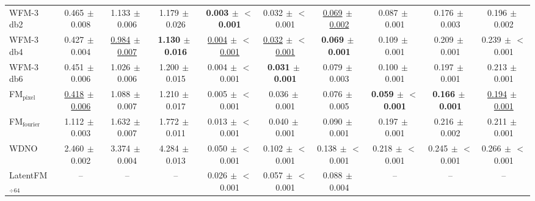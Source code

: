 \begin{table}[ht]
{\begin{tabular}{l ccc ccc ccc}
WFM-3 db2 & 0.465{\scriptsize$\,\pm\,$0.008} & 1.133{\scriptsize$\,\pm\,$0.006} & 1.179{\scriptsize$\,\pm\,$0.026} & \textbf{0.003{\scriptsize$\,\pm\,$$<$0.001}} & 0.032{\scriptsize$\,\pm\,$$<$0.001} & \underline{0.069{\scriptsize$\,\pm\,$0.002}} & 0.087{\scriptsize$\,\pm\,$0.001} & 0.176{\scriptsize$\,\pm\,$0.003} & 0.196{\scriptsize$\,\pm\,$0.002} \\
WFM-3 db4 & 0.427{\scriptsize$\,\pm\,$0.004} & \underline{0.984{\scriptsize$\,\pm\,$0.007}} & \textbf{1.130{\scriptsize$\,\pm\,$0.016}} & \underline{0.004{\scriptsize$\,\pm\,$$<$0.001}} & \underline{0.032{\scriptsize$\,\pm\,$$<$0.001}} & \textbf{0.069{\scriptsize$\,\pm\,$0.001}} & 0.109{\scriptsize$\,\pm\,$0.001} & 0.209{\scriptsize$\,\pm\,$0.001} & 0.239{\scriptsize$\,\pm\,$$<$0.001} \\
WFM-3 db6 & 0.451{\scriptsize$\,\pm\,$0.006} & 1.026{\scriptsize$\,\pm\,$0.006} & 1.200{\scriptsize$\,\pm\,$0.015} & 0.004{\scriptsize$\,\pm\,$$<$0.001} & \textbf{0.031{\scriptsize$\,\pm\,$0.001}} & 0.079{\scriptsize$\,\pm\,$0.003} & 0.100{\scriptsize$\,\pm\,$0.001} & 0.197{\scriptsize$\,\pm\,$0.001} & 0.213{\scriptsize$\,\pm\,$0.001} \\
\midrule
FM$_\text{pixel}$ & \underline{0.418{\scriptsize$\,\pm\,$0.006}} & 1.088{\scriptsize$\,\pm\,$0.007} & 1.210{\scriptsize$\,\pm\,$0.017} & 0.005{\scriptsize$\,\pm\,$$<$0.001} & 0.036{\scriptsize$\,\pm\,$0.001} & 0.076{\scriptsize$\,\pm\,$0.005} & \textbf{0.059{\scriptsize$\,\pm\,$$<$0.001}} & \textbf{0.166{\scriptsize$\,\pm\,$0.001}} & \underline{0.194{\scriptsize$\,\pm\,$0.001}} \\
FM$_\text{fourier}$ & 1.112{\scriptsize$\,\pm\,$0.003} & 1.632{\scriptsize$\,\pm\,$0.007} & 1.772{\scriptsize$\,\pm\,$0.011} & 0.013{\scriptsize$\,\pm\,$$<$0.001} & 0.040{\scriptsize$\,\pm\,$0.001} & 0.090{\scriptsize$\,\pm\,$0.001} & 0.197{\scriptsize$\,\pm\,$0.001} & 0.216{\scriptsize$\,\pm\,$0.002} & 0.211{\scriptsize$\,\pm\,$0.001} \\
WDNO & 2.460{\scriptsize$\,\pm\,$0.002} & 3.374{\scriptsize$\,\pm\,$0.004} & 4.284{\scriptsize$\,\pm\,$0.013} & 0.050{\scriptsize$\,\pm\,$$<$0.001} & 0.102{\scriptsize$\,\pm\,$$<$0.001} & 0.138{\scriptsize$\,\pm\,$$<$0.001} & 0.218{\scriptsize$\,\pm\,$$<$0.001} & 0.245{\scriptsize$\,\pm\,$$<$0.001} & 0.266{\scriptsize$\,\pm\,$$<$0.001} \\
LatentFM$_{\div 64}$ & -- & -- & -- & 0.026{\scriptsize$\,\pm\,$$<$0.001} & 0.057{\scriptsize$\,\pm\,$$<$0.001} & 0.088{\scriptsize$\,\pm\,$0.004} & -- & -- & -- \\
\bottomrule
\end{tabular}
}
\end{table}
